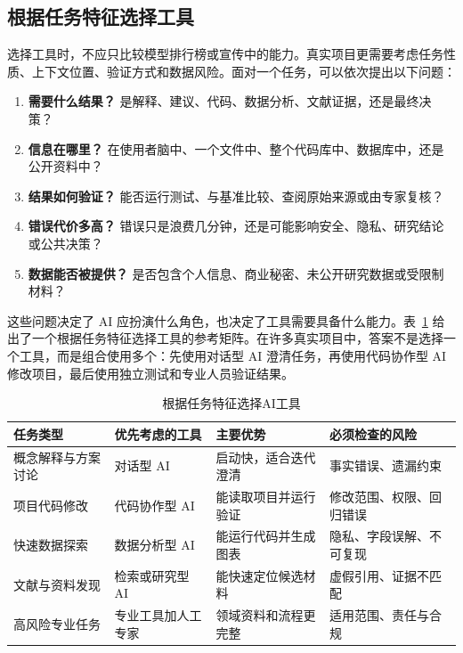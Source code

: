 \subsection{根据任务特征选择工具}

选择工具时，不应只比较模型排行榜或宣传中的能力。真实项目更需要考虑任务性质、上下文位置、验证方式和数据风险。面对一个任务，可以依次提出以下问题：

\begin{enumerate}
  \item \textbf{需要什么结果？} 是解释、建议、代码、数据分析、文献证据，还是最终决策？
  \item \textbf{信息在哪里？} 在使用者脑中、一个文件中、整个代码库中、数据库中，还是公开资料中？
  \item \textbf{结果如何验证？} 能否运行测试、与基准比较、查阅原始来源或由专家复核？
  \item \textbf{错误代价多高？} 错误只是浪费几分钟，还是可能影响安全、隐私、研究结论或公共决策？
  \item \textbf{数据能否被提供？} 是否包含个人信息、商业秘密、未公开研究数据或受限制材料？
\end{enumerate}

这些问题决定了 AI 应扮演什么角色，也决定了工具需要具备什么能力。表~\ref{tab:tool_selection} 给出了一个根据任务特征选择工具的参考矩阵。在许多真实项目中，答案不是选择一个工具，而是组合使用多个：先使用对话型 AI 澄清任务，再使用代码协作型 AI 修改项目，最后使用独立测试和专业人员验证结果。

\begin{table}[H]
\centering
\caption{根据任务特征选择AI工具}
\label{tab:tool_selection}
\begin{tabular}{p{2.6cm}p{3.4cm}p{3.4cm}p{3.2cm}}
\toprule
任务类型 & 优先考虑的工具 & 主要优势 & 必须检查的风险 \\
\midrule
概念解释与方案讨论 & 对话型 AI & 启动快，适合迭代澄清 & 事实错误、遗漏约束 \\
项目代码修改 & 代码协作型 AI & 能读取项目并运行验证 & 修改范围、权限、回归错误 \\
快速数据探索 & 数据分析型 AI & 能运行代码并生成图表 & 隐私、字段误解、不可复现 \\
文献与资料发现 & 检索或研究型 AI & 能快速定位候选材料 & 虚假引用、证据不匹配 \\
高风险专业任务 & 专业工具加人工专家 & 领域资料和流程更完整 & 适用范围、责任与合规 \\
\bottomrule
\end{tabular}
\end{table}

